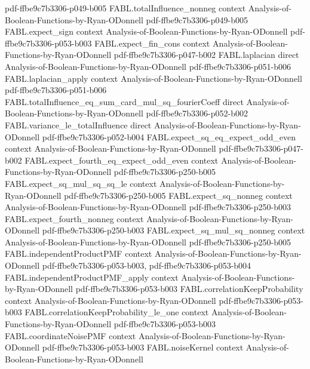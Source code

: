 \begin{theorem}
  {pdf-ffbe9c7b3306-p049-b005}
\proofstep
  {FABL.totalInfluence_nonneg}
  {context}
  {Analysis-of-Boolean-Functions-by-Ryan-ODonnell}
  {pdf-ffbe9c7b3306-p049-b005}
\proofstep
  {FABL.expect_sign}
  {context}
  {Analysis-of-Boolean-Functions-by-Ryan-ODonnell}
  {pdf-ffbe9c7b3306-p053-b003}
\proofstep
  {FABL.expect_fin_cons}
  {context}
  {Analysis-of-Boolean-Functions-by-Ryan-ODonnell}
  {pdf-ffbe9c7b3306-p047-b002}
\proofstep
  {FABL.laplacian}
  {direct}
  {Analysis-of-Boolean-Functions-by-Ryan-ODonnell}
  {pdf-ffbe9c7b3306-p051-b006}
\proofstep
  {FABL.laplacian_apply}
  {context}
  {Analysis-of-Boolean-Functions-by-Ryan-ODonnell}
  {pdf-ffbe9c7b3306-p051-b006}
\proofstep
  {FABL.totalInfluence_eq_sum_card_mul_sq_fourierCoeff}
  {direct}
  {Analysis-of-Boolean-Functions-by-Ryan-ODonnell}
  {pdf-ffbe9c7b3306-p052-b002}
\proofstep
  {FABL.variance_le_totalInfluence}
  {direct}
  {Analysis-of-Boolean-Functions-by-Ryan-ODonnell}
  {pdf-ffbe9c7b3306-p052-b004}
\proofstep
  {FABL.expect_sq_eq_expect_odd_even}
  {context}
  {Analysis-of-Boolean-Functions-by-Ryan-ODonnell}
  {pdf-ffbe9c7b3306-p047-b002}
\proofstep
  {FABL.expect_fourth_eq_expect_odd_even}
  {context}
  {Analysis-of-Boolean-Functions-by-Ryan-ODonnell}
  {pdf-ffbe9c7b3306-p250-b005}
\proofstep
  {FABL.expect_sq_mul_sq_sq_le}
  {context}
  {Analysis-of-Boolean-Functions-by-Ryan-ODonnell}
  {pdf-ffbe9c7b3306-p250-b005}
\proofstep
  {FABL.expect_sq_nonneg}
  {context}
  {Analysis-of-Boolean-Functions-by-Ryan-ODonnell}
  {pdf-ffbe9c7b3306-p250-b003}
\proofstep
  {FABL.expect_fourth_nonneg}
  {context}
  {Analysis-of-Boolean-Functions-by-Ryan-ODonnell}
  {pdf-ffbe9c7b3306-p250-b003}
\proofstep
  {FABL.expect_sq_mul_sq_nonneg}
  {context}
  {Analysis-of-Boolean-Functions-by-Ryan-ODonnell}
  {pdf-ffbe9c7b3306-p250-b005}
\proofstep
  {FABL.independentProductPMF}
  {context}
  {Analysis-of-Boolean-Functions-by-Ryan-ODonnell}
  {pdf-ffbe9c7b3306-p053-b003,
    pdf-ffbe9c7b3306-p053-b004}
\proofstep
  {FABL.independentProductPMF_apply}
  {context}
  {Analysis-of-Boolean-Functions-by-Ryan-ODonnell}
  {pdf-ffbe9c7b3306-p053-b003}
\proofstep
  {FABL.correlationKeepProbability}
  {context}
  {Analysis-of-Boolean-Functions-by-Ryan-ODonnell}
  {pdf-ffbe9c7b3306-p053-b003}
\proofstep
  {FABL.correlationKeepProbability_le_one}
  {context}
  {Analysis-of-Boolean-Functions-by-Ryan-ODonnell}
  {pdf-ffbe9c7b3306-p053-b003}
\proofstep
  {FABL.coordinateNoisePMF}
  {context}
  {Analysis-of-Boolean-Functions-by-Ryan-ODonnell}
  {pdf-ffbe9c7b3306-p053-b003}
\proofstep
  {FABL.noiseKernel}
  {context}
  {Analysis-of-Boolean-Functions-by-Ryan-ODonnell}

\end{theorem}
